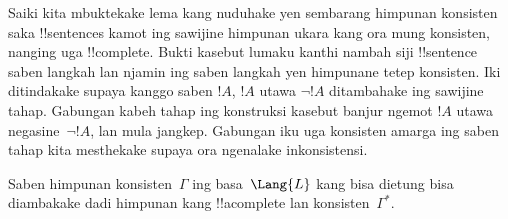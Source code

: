 \documentclass[../../../include/open-logic-section]{subfiles}
\begin{document}
      {}
      {}


\begin{explain}
Saiki kita mbuktekake lema kang nuduhake yen sembarang himpunan
konsisten saka !!{sentence}s kamot ing sawijine himpunan ukara kang
ora mung konsisten, nanging uga !!{complete}. Bukti kasebut lumaku
kanthi nambah siji !!{sentence} saben langkah lan njamin ing saben
langkah yen himpunane tetep konsisten. Iki ditindakake supaya kanggo
saben $!A$, $!A$ utawa $\lnot !A$ ditambahake ing sawijine tahap.
Gabungan kabeh tahap ing konstruksi kasebut banjur ngemot $!A$ utawa
negasine~$\lnot !A$, lan mula jangkep. Gabungan iku uga konsisten
amarga ing saben tahap kita mesthekake supaya ora ngenalake
inkonsistensi.
\end{explain}

\begin{lem}
 Saben himpunan konsisten~$\Gamma$ ing
basa~$\Lang{L}$ kang bisa dietung bisa diambakake dadi himpunan kang !!a{complete} lan
konsisten~$\Gamma^*$.
\end{lem}
\end{document}
